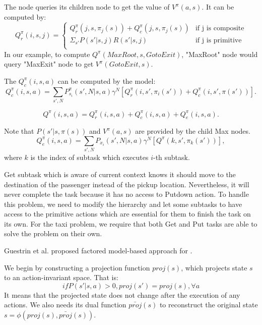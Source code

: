 The node queries its children node to get the value of $V^{\pi}(a, s)$.
It can be computed by:
\begin{equation}
    Q_r^{\pi}(i, s, j) = 
    \left\{\begin{array}{ll}
        Q_r^{\pi}(j, s, \pi_j(s)) + Q_c^{\pi}(j, s, \pi_j(s))& \mbox{if j is composite} \\
        \Sigma_{s'} P(s'|s, j)R(s'|s, j) & \mbox{if j is primitive} \\  
    \end{array} \right.
    \label{eq:Qr}
\end{equation}
In our example, to compute $Q^{\pi}(MaxRoot, s, GotoExit)$, "MaxRoot" node would query 
"MaxExit" node to get $V^{\pi}(GotoExit, s)$.

The $Q_c^{\pi}(i, s, a)$ can be computed by the model:
\begin{equation}
    Q_c^{\pi}(i, s, a) = \sum_{s', N} P_{s_i}^{\pi}(s', N|s, a)\gamma^N[Q_r^{\pi}(i, s', \pi_i(s')) + Q_c^{\pi}(i, s', \pi(s'))].
    \label{eq:Qc}
\end{equation}

\begin{equation}
    Q^{\pi}(i, s, a) = Q_r^{\pi}(i, s, a) + Q_c^{\pi}(i, s, a) + Q_e^{\pi}(i, s, a).
    \label{eq:HordQ}
\end{equation}

Note that $P(s'|s, \pi(s))$ and $V^{\pi}(a, s)$ are provided by the child Max nodes.
\begin{equation}
    Q_e^{\pi}(i, s, a) = \sum_{s', N} P_{x_i}(s', N|s, a)\gamma^N[Q^{\pi}(k, s', \pi_k(s'))],
    \label{eq:Qe}
\end{equation}
where $k$ is the index of subtask which executes $i$-th subtask.

Get subtask which is aware of current context knows
it should move to the destination of the passenger instead of the pickup location.
Nevertheless, it will never complete the task because it has no access to Putdown 
action. To handle this problem, we need to modify the hierarchy and let some subtasks 
to have access to the primitive actions which are essential for them to finish
the task on its own. For the taxi problem, we require that both Get and Put tasks
are able to solve the problem on their own.

Guestrin et al. \cite{ApproxFactor} proposed factored model-based approach for .

We begin by constructing a projection function $proj(s)$,
which projects state $s$ to an action-invariant space.
That is:
\begin{equation}
    if P(s'|s, a) > 0, proj(s') = proj(s), \forall a
\end{equation}
It means that the projected state does not change after the execution of 
any actions.
We also needs its dual function $\bar{proj}(s)$ to reconstruct 
the original state $s = \phi(proj(s), \bar{proj}(s))$.

